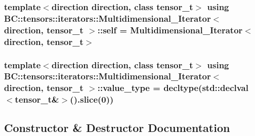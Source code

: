 \subsubsection[{\texorpdfstring{self}{self}}]{\setlength{\rightskip}{0pt plus 5cm}template$<$direction direction, class tensor\+\_\+t$>$ using {\bf B\+C\+::tensors\+::iterators\+::\+Multidimensional\+\_\+\+Iterator}$<$ {\bf direction}, tensor\+\_\+t $>$\+::{\bf self} =  {\bf Multidimensional\+\_\+\+Iterator}$<${\bf direction}, tensor\+\_\+t$>$}\hypertarget{structBC_1_1tensors_1_1iterators_1_1Multidimensional__Iterator_a6370d6c3ef166ac92fd31f4718f17536}{}\label{structBC_1_1tensors_1_1iterators_1_1Multidimensional__Iterator_a6370d6c3ef166ac92fd31f4718f17536}
\subsubsection[{\texorpdfstring{value\+\_\+type}{value_type}}]{\setlength{\rightskip}{0pt plus 5cm}template$<$direction direction, class tensor\+\_\+t$>$ using {\bf B\+C\+::tensors\+::iterators\+::\+Multidimensional\+\_\+\+Iterator}$<$ {\bf direction}, tensor\+\_\+t $>$\+::{\bf value\+\_\+type} =  decltype(std\+::declval$<$tensor\+\_\+t\&$>$().slice(0))}\hypertarget{structBC_1_1tensors_1_1iterators_1_1Multidimensional__Iterator_ab876f005ae32c434ca78921214a3ecec}{}\label{structBC_1_1tensors_1_1iterators_1_1Multidimensional__Iterator_ab876f005ae32c434ca78921214a3ecec}


\subsection{Constructor \& Destructor Documentation}

